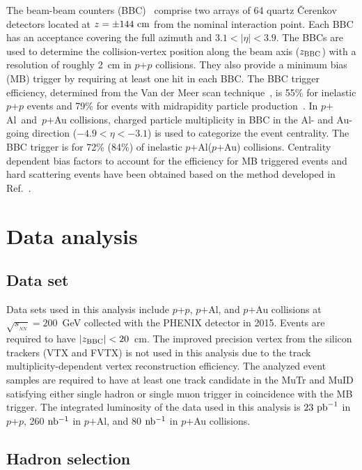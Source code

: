 \documentclass[twocolumn,letterpaper,aps,prc,longbibliography,superscriptaddress,nofootinbib,floatfix]{revtex4-2}
\newcommand{\zbbc}{\mbox{$z_{\rm BBC}$}\xspace}
\newcommand{\sqsntwo}{\mbox{$\sqrt{s_{_{NN}}}=200$~GeV}\xspace}
\newcommand{\pp}{\mbox{$p$+$p$}\xspace}
\newcommand{\pau}{\mbox{$p$$+$Au}\xspace}
\newcommand{\pal}{\mbox{$p$$+$Al}\xspace}
\newcommand{\palau}{\mbox{$p$$+$Al and $p$$+$Au}\xspace}
\begin{document}
The beam-beam counters (BBC)~\cite{Allen:2003zt} comprise two arrays 
of 64 quartz \v{C}erenkov detectors located at $z=\pm144~{\rm cm}$ from 
the nominal interaction point. Each BBC has an acceptance covering the 
full azimuth and $3.1<|\eta|<3.9$. The BBCs are used to determine the 
collision-vertex position along the beam axis ($z_{\rm BBC}$) with a 
resolution of roughly 2~cm in \pp collisions. They also provide a 
minimum bias (MB) trigger by requiring at least one hit in each BBC. The 
BBC trigger efficiency, determined from the Van der Meer scan 
technique~\cite{Drees:2003zza}, is 55\% for inelastic \pp events and 
79\% for events with midrapidity particle 
production~\cite{Adler:2003pb}. In \palau collisions, charged particle 
multiplicity in BBC in the Al- and Au-going direction ($-4.9<\eta<-3.1$) is 
used to categorize the event centrality. The BBC trigger is for 72\% 
(84\%) of inelastic \pal (\pau) collisions. Centrality dependent bias 
factors to account for the efficiency for MB triggered events and hard 
scattering events have been obtained based on the method developed in 
Ref.~\cite{Adare:2013nff}.

\section{Data analysis}
\label{sec:analysis}

\subsection{Data set}
\label{sec:dataset}

Data sets used in this analysis include \pp, \pal, and \pau collisions 
at \sqsntwo collected with the PHENIX detector in 2015. Events are 
required to have $|\zbbc|<20$~cm.  The improved precision vertex from 
the silicon trackers (VTX and FVTX) is not used in this analysis due to 
the track multiplicity-dependent vertex reconstruction efficiency. The 
analyzed event samples are required to have at least one track candidate 
in the MuTr and MuID satisfying either single hadron or single muon 
trigger in coincidence with the MB trigger. The integrated luminosity of 
the data used in this analysis is $23~{\rm pb}^{-1}$ in \pp, 260 ${\rm 
nb^{-1}}$ in \pal, and 80 ${\rm nb^{-1}}$ in \pau collisions.

\subsection{Hadron selection}
\label{sec:hadronsel}
\end{document}
